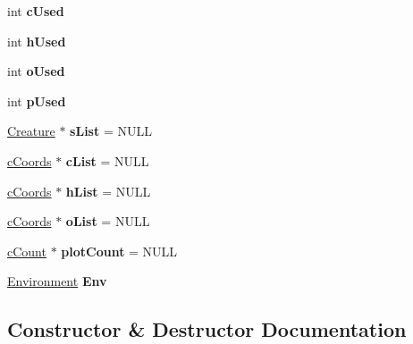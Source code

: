 \begin{DoxyCompactItemize}
int {\bfseries c\+Used}
\item 
\mbox{\label{class_main_window_a14056e5221af6e151c12460b6e5e6487}} 
int {\bfseries h\+Used}
\item 
\mbox{\label{class_main_window_ae799f62cf4797132d297ec57ba90f7ba}} 
int {\bfseries o\+Used}
\item 
\mbox{\label{class_main_window_a622e8f757c6c533e46e9cd6c053a0e47}} 
int {\bfseries p\+Used}
\item 
\mbox{\label{class_main_window_afb57e3195ba1109e92fd4211eb35d740}} 
\hyperlink{class_creature}{Creature} $\ast$ {\bfseries s\+List} = N\+U\+LL
\item 
\mbox{\label{class_main_window_a0da4e7dbcead644c0ea0a4f643885baf}} 
\hyperlink{struct_main_window_1_1c_coords}{c\+Coords} $\ast$ {\bfseries c\+List} = N\+U\+LL
\item 
\mbox{\label{class_main_window_a88ca702f5b1bd1be6343e710f818acc9}} 
\hyperlink{struct_main_window_1_1c_coords}{c\+Coords} $\ast$ {\bfseries h\+List} = N\+U\+LL
\item 
\mbox{\label{class_main_window_a01a05cc067bb0125eb1ad8e4e883837c}} 
\hyperlink{struct_main_window_1_1c_coords}{c\+Coords} $\ast$ {\bfseries o\+List} = N\+U\+LL
\item 
\mbox{\label{class_main_window_a0578b620cc92817cab4480433542e83a}} 
\hyperlink{struct_main_window_1_1c_count}{c\+Count} $\ast$ {\bfseries plot\+Count} = N\+U\+LL
\item 
\mbox{\label{class_main_window_a542517069b2f09f81ca545866509f063}} 
\hyperlink{class_environment}{Environment} {\bfseries Env}
\end{DoxyCompactItemize}


\subsection{Constructor \& Destructor Documentation}
\mbox{\label{class_main_window_a8b244be8b7b7db1b08de2a2acb9409db}} 
